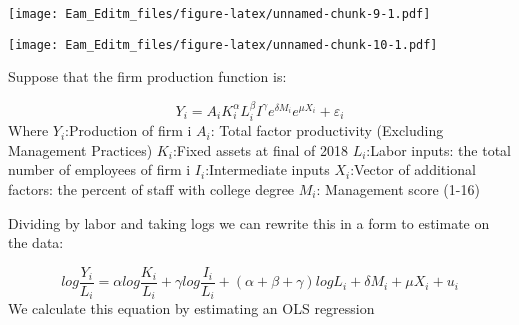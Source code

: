 \documentclass[]{article}
\begin{document}
\texttt{[image: Eam\_Editm\_files/figure-latex/unnamed-chunk-9-1.pdf]}

\texttt{[image: Eam\_Editm\_files/figure-latex/unnamed-chunk-10-1.pdf]}

Suppose that the firm production function is:

\[Y_{i} = A_{i}K_{i}^{\alpha}L_{i}^{\beta}I^{\gamma}e^{\delta M_{i}}e^{\mu X_{i}} + \varepsilon_{i}\]
Where \(Y_{i}\):Production of firm i \(A_{i}\): Total factor
productivity (Excluding Management Practices) \(K_{i}\):Fixed assets at
final of 2018 \(L_{i}\):Labor inputs: the total number of employees of
firm i \(I_{i}\):Intermediate inputs \(X_{i}\):Vector of additional
factors: the percent of staff with college degree \(M_{i}\): Management
score (1-16)

Dividing by labor and taking logs we can rewrite this in a form to
estimate on the data:

\[log\frac{Y_{i}}{L_{i}} = \alpha log\frac{K_{i}}{L_{i}} + \gamma log \frac{I_{i}}{L_{i}} + (\alpha+ \beta  +\gamma)log L_{i} +\delta M_{i} + \mu X_{i} + u_{i} \]
We calculate this equation by estimating an OLS regression
\end{document}
